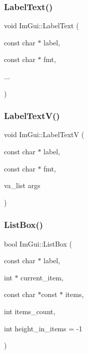 \subsubsection{\texorpdfstring{Label\+Text()}{LabelText()}}
{\footnotesize\ttfamily void Im\+Gui\+::\+Label\+Text (\begin{DoxyParamCaption}\item[{const char $\ast$}]{label,  }\item[{const char $\ast$}]{fmt,  }\item[{}]{... }\end{DoxyParamCaption})}

\hypertarget{namespace_im_gui_a55e5a7edb676a8f5cd7f65443138a8a0}{}\label{namespace_im_gui_a55e5a7edb676a8f5cd7f65443138a8a0} 
\subsubsection{\texorpdfstring{Label\+Text\+V()}{LabelTextV()}}
{\footnotesize\ttfamily void Im\+Gui\+::\+Label\+TextV (\begin{DoxyParamCaption}\item[{const char $\ast$}]{label,  }\item[{const char $\ast$}]{fmt,  }\item[{va\+\_\+list}]{args }\end{DoxyParamCaption})}

\hypertarget{namespace_im_gui_a93d68a6602e155134405ce17085501e9}{}\label{namespace_im_gui_a93d68a6602e155134405ce17085501e9} 
\subsubsection{\texorpdfstring{List\+Box()}{ListBox()}\hspace{0.1cm}{\footnotesize\ttfamily [1/2]}}
{\footnotesize\ttfamily bool Im\+Gui\+::\+List\+Box (\begin{DoxyParamCaption}\item[{const char $\ast$}]{label,  }\item[{int $\ast$}]{current\+\_\+item,  }\item[{const char $\ast$const $\ast$}]{items,  }\item[{int}]{items\+\_\+count,  }\item[{int}]{height\+\_\+in\+\_\+items = {\ttfamily -\/1} }\end{DoxyParamCaption})}

